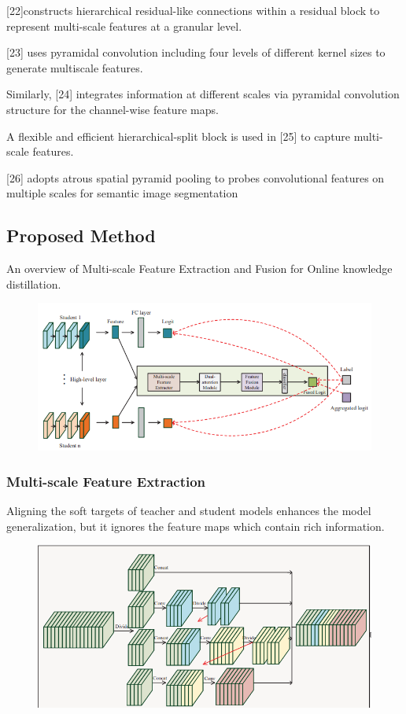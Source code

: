 \documentclass[11pt]{article}
\begin{document}
[22]constructs hierarchical residual-like connections within a residual block to represent multi-scale features at a granular level. 

[23] uses pyramidal convolution including four levels of different kernel sizes to generate multiscale features. 

Similarly, [24] integrates information at different scales via pyramidal convolution structure for the channel-wise feature maps.

A flexible and efficient hierarchical-split block is used in [25] to capture multi-scale features. 
 
[26] adopts atrous spatial pyramid pooling to probes convolutional features on multiple scales for semantic image segmentation

\subsection{Proposed Method}
An overview of Multi-scale Feature Extraction and Fusion for Online knowledge distillation.

\begin{figure}[H]
	\centering
	\includegraphics[scale = 0.5]{104}
\end{figure}
\subsubsection{Multi-scale Feature Extraction}
Aligning the soft targets of teacher and student models enhances the model generalization, but it ignores the feature maps which contain rich information.

\begin{figure}[H]
	\centering
	\includegraphics[scale = 0.5]{105}
\end{figure}
\end{document}

